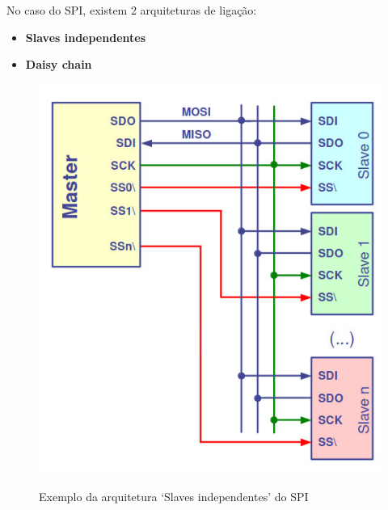 \documentclass[a4paper, 12pt, onecolumn, oneside]{scrartcl}
\begin{document}
No caso do SPI, existem 2 arquiteturas de ligação:
\begin{itemize}
    \item \textbf{Slaves independentes}
    \item \textbf{Daisy chain}
\end{itemize}
\begin{figure}[H]
    \centering
    \begin{minipage}{0.48\textwidth}
        \includegraphics[width=\textwidth]{Arquitetura-de-ligação-1_SPI.jpg}
        \caption{Exemplo da arquitetura `Slaves independentes' do SPI}\label{fig2}
    \end{minipage}
    \hfill
    \begin{minipage}{0.48\textwidth}\label{fig3}

\end{minipage}
\end{figure}
\end{document}
